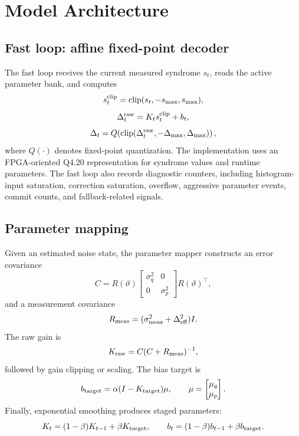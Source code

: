 \documentclass[11pt]{article}
\begin{document}
\section{Model Architecture}

\subsection{Fast loop: affine fixed-point decoder}

The fast loop receives the current measured syndrome \(s_t\), reads the active
parameter bank, and computes
\begin{equation}
    s_t^{\rm clip}={\rm clip}(s_t,-s_{\max},s_{\max}),
\end{equation}
\begin{equation}
    \Delta_t^{\rm raw}=K_t s_t^{\rm clip}+b_t,
\end{equation}
\begin{equation}
    \Delta_t=Q\!\left({\rm clip}(\Delta_t^{\rm raw},
    -\Delta_{\max},\Delta_{\max})\right),
\end{equation}
where \(Q(\cdot)\) denotes fixed-point quantization.  The implementation uses
an FPGA-oriented Q4.20 representation for syndrome values and runtime
parameters.  The fast loop also records diagnostic counters, including
histogram-input saturation, correction saturation, overflow, aggressive
parameter events, commit counts, and fallback-related signals.

\subsection{Parameter mapping}

Given an estimated noise state, the parameter mapper constructs an error
covariance
\begin{equation}
    C =
    R(\vartheta)
    \begin{bmatrix}
        \sigma_q^2 & 0\\
        0 & \sigma_p^2
    \end{bmatrix}
    R(\vartheta)^\top ,
\end{equation}
and a measurement covariance
\begin{equation}
    R_{\rm meas}=(\sigma_{\rm meas}^2+\Delta_{\rm eff}^2)I.
\end{equation}
The raw gain is
\begin{equation}
    K_{\rm raw}=C(C+R_{\rm meas})^{-1},
\end{equation}
followed by gain clipping or scaling.  The bias target is
\begin{equation}
    b_{\rm target}=\alpha(I-K_{\rm target})\mu,
    \qquad
    \mu=\begin{bmatrix}\mu_q\\\mu_p\end{bmatrix}.
\end{equation}
Finally, exponential smoothing produces staged parameters:
\begin{equation}
    K_t=(1-\beta)K_{t-1}+\beta K_{\rm target},
    \qquad
    b_t=(1-\beta)b_{t-1}+\beta b_{\rm target}.
\end{equation}
\end{document}
